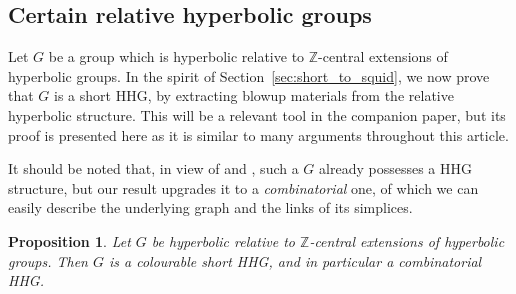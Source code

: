 \documentclass[svgnames]{amsart}
\theoremstyle{plain}
\newtheorem{prop}[thm]{Proposition}
\theoremstyle{definition}
\newcommand{\Z}{\mathbb{Z}}
\begin{document}
\subsection{Certain relative hyperbolic groups}\label{sec:hyp_rel_zbyhyp}
Let $G$ be a group which is hyperbolic relative to $\Z$-central extensions of hyperbolic groups. In the spirit of Section~\ref{sec:short_to_squid}, we now prove that $G$ is a short HHG, by extracting blowup materials from the relative hyperbolic structure. This will be a relevant tool in the companion paper, but its proof is presented here as it is similar to many arguments throughout this article.


It should be noted that, in view of \cite[Corollary 4.3]{HRSS_3manifold} and \cite[Theorem 9.1]{HHS_II}, such a $G$ already possesses a HHG structure, but our result upgrades it to a \emph{combinatorial} one, of which we can easily describe the underlying graph and the links of its simplices.  

\begin{prop}\label{prop:hyp_rel_Z-central_is_short}
    Let $G$ be hyperbolic relative to $\Z$-central extensions of hyperbolic groups. Then $G$ is a colourable short HHG, and in particular a combinatorial HHG.
\end{prop}
\end{document}
